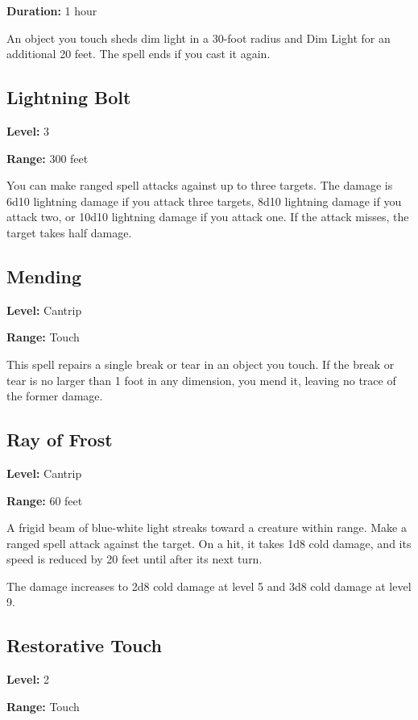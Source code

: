 \documentclass[12pt,letterpaper,twocolumn,openany,nodeprecatedcode,bg=none]{dndbook}
\let\oldsubsection\subsection
\renewcommand{\subsection}[1]{%
  \needspace{5\baselineskip}%
  \oldsubsection{#1}%
}
\begin{document}
\textbf{Duration:} 1 hour

An object you touch sheds dim light in a 30-foot radius and Dim Light
for an additional 20 feet. The spell ends if you cast it again.

\subsection{Lightning Bolt}\label{lightning-bolt}

\textbf{Level:} 3

\textbf{Range:} 300 feet

You can make ranged spell attacks against up to three targets. The
damage is 6d10 lightning damage if you attack three targets, 8d10
lightning damage if you attack two, or 10d10 lightning damage if you
attack one. If the attack misses, the target takes half damage.

\subsection{Mending}\label{mending}

\textbf{Level:} Cantrip

\textbf{Range:} Touch

This spell repairs a single break or tear in an object you touch. If the
break or tear is no larger than 1 foot in any dimension, you mend it,
leaving no trace of the former damage.

\subsection{Ray of Frost}\label{ray-of-frost}

\textbf{Level:} Cantrip

\textbf{Range:} 60 feet

A frigid beam of blue-white light streaks toward a creature within
range. Make a ranged spell attack against the target. On a hit, it takes
1d8 cold damage, and its speed is reduced by 20 feet until after its
next turn.

The damage increases to 2d8 cold damage at level 5 and 3d8 cold damage
at level 9.

\subsection{Restorative Touch}\label{restorative-touch}

\textbf{Level:} 2

\textbf{Range:} Touch
\end{document}
